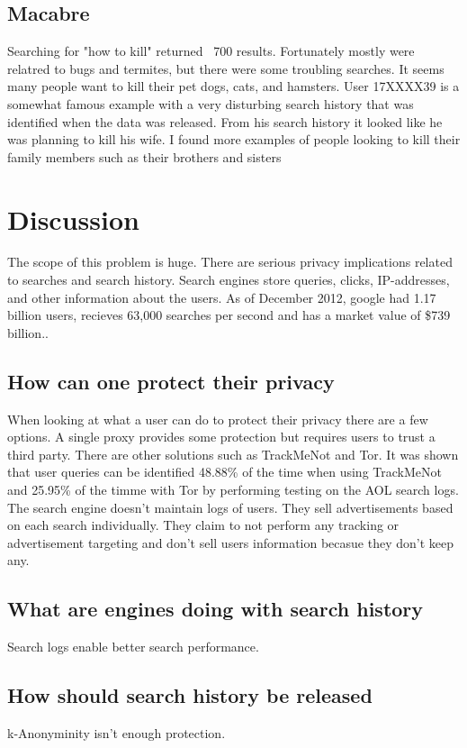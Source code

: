 \documentclass{article}
\begin{document}
\subsection{Macabre}
Searching for "how to kill" returned ~700 results. Fortunately mostly were relatred to bugs and termites, but there were some troubling searches. It seems many people want to kill their pet dogs, cats, and hamsters. User 17XXXX39 is a somewhat famous example\cite{murder} with a very disturbing search history that was identified when the data was released. From his search history it looked like he was planning to kill his wife. I found more examples of people looking to kill their family members such as their brothers and sisters
\section{Discussion}
The scope of this problem is huge. There are serious privacy implications related to searches and search history. Search engines store queries, clicks, IP-addresses, and other information about the users. As of December 2012, google had 1.17 billion users\cite{google1}, recieves 63,000 searches per second and has a market value of \$739 billion.\cite{google}.
\subsection{How can one protect their privacy}
When looking at what a user can do to protect their privacy there are a few options. A single proxy provides some protection but requires users to trust a third party. There are other solutions such as TrackMeNot and Tor. It was shown that user queries can be identified 48.88\% of the time when using TrackMeNot and 25.95\% of the timme with Tor by performing testing on the AOL search logs\cite{TMN-Tor}. The search engine  doesn't maintain logs of users. They sell advertisements based on each search individually. They claim to not perform any tracking or advertisement targeting and don't sell users information becasue they don't keep any.

\subsection{What are engines doing with search history}
Search logs enable better search performance.

\subsection{How should search history be released}
k-Anonyminity isn't enough protection. \cite{publishing}
\end{document}
